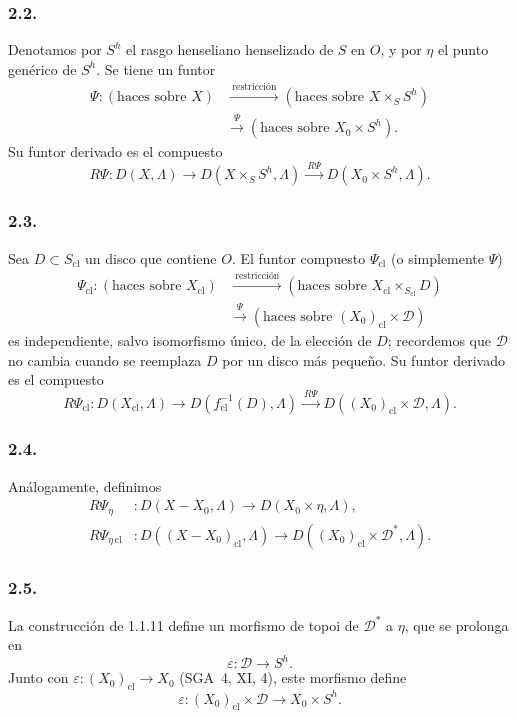 \pageoriginale

\subsubsection*{2.2.}
Denotamos por $S^h$ el rasgo henseliano henselizado de $S$ en $O$, y por
$\eta$ el punto genérico de $S^h$. Se tiene un funtor
\[
\begin{aligned}
\Psi:(\text{haces sobre }X)
&\xrightarrow{\ \text{restricción}\ }
(\text{haces sobre }X\times_SS^h)\\
&\xrightarrow{\ \Psi\ }
(\text{haces sobre }X_0\times S^h).
\end{aligned}
\]
Su funtor derivado es el compuesto
\[
R\Psi:D(X,\Lambda)
\longrightarrow D(X\times_SS^h,\Lambda)
\xrightarrow{\ R\Psi\ }D(X_0\times S^h,\Lambda).
\]

\subsubsection*{2.3.}
Sea $D\subset S_{\mathrm{cl}}$ un disco que contiene $O$. El funtor compuesto
$\Psi_{\mathrm{cl}}$ (o simplemente $\Psi$)
\[
\begin{aligned}
\Psi_{\mathrm{cl}}:(\text{haces sobre }X_{\mathrm{cl}})
&\xrightarrow{\ \text{restricción}\ }
(\text{haces sobre }X_{\mathrm{cl}}\times_{S_{\mathrm{cl}}}D)\\
&\xrightarrow{\ \Psi\ }
(\text{haces sobre }(X_0)_{\mathrm{cl}}\times\mathcal D)
\end{aligned}
\]
es independiente, salvo isomorfismo único, de la elección de $D$; recordemos
que $\mathcal D$ no cambia cuando se reemplaza $D$ por un disco más pequeño.
Su funtor derivado es el compuesto
\[
R\Psi_{\mathrm{cl}}:D(X_{\mathrm{cl}},\Lambda)
\longrightarrow D(f_{\mathrm{cl}}^{-1}(D),\Lambda)
\xrightarrow{\ R\Psi\ }
D((X_0)_{\mathrm{cl}}\times\mathcal D,\Lambda).
\]

\subsubsection*{2.4.}
Análogamente, definimos
\[
\begin{aligned}
R\Psi_\eta &:D(X-X_0,\Lambda)
  \longrightarrow D(X_0\times\eta,\Lambda),\\
R\Psi_{\eta\,\mathrm{cl}} &:D((X-X_0)_{\mathrm{cl}},\Lambda)
  \longrightarrow D((X_0)_{\mathrm{cl}}\times\mathcal D^*,\Lambda).
\end{aligned}
\]

\subsubsection*{2.5.}
La construcción de 1.1.11 define un morfismo de topoi de $\mathcal D^*$ a
$\eta$, que se prolonga en
\[
\varepsilon:\mathcal D\longrightarrow S^h.
\]
Junto con $\varepsilon:(X_0)_{\mathrm{cl}}\longrightarrow X_0$ (SGA~4, XI,
4), este morfismo define
\[
\varepsilon:(X_0)_{\mathrm{cl}}\times\mathcal D
\longrightarrow X_0\times S^h.
\]

